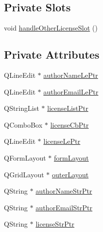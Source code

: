 \subsection*{Private Slots}
\begin{DoxyCompactItemize}
\item 
void \hyperlink{class_new_project_page__3_aa4dede7e921ca1cd0da7c36f421d02b9}{handle\-Other\-License\-Slot} ()
\end{DoxyCompactItemize}
\subsection*{Private Attributes}
\begin{DoxyCompactItemize}
\item 
Q\-Line\-Edit $\ast$ \hyperlink{class_new_project_page__3_aea99558cfb4c4d06ab1d090276c8b500}{author\-Name\-Le\-Ptr}
\item 
Q\-Line\-Edit $\ast$ \hyperlink{class_new_project_page__3_a34b1101f7b0179d76b0cf77e5584233c}{author\-Email\-Le\-Ptr}
\item 
Q\-String\-List $\ast$ \hyperlink{class_new_project_page__3_a5bcc5f30aa601338c5ee258e21868216}{license\-List\-Ptr}
\item 
Q\-Combo\-Box $\ast$ \hyperlink{class_new_project_page__3_a6459aad502f0b64eb7e16b38261bae85}{license\-Cb\-Ptr}
\item 
Q\-Line\-Edit $\ast$ \hyperlink{class_new_project_page__3_aee5b07b36bc086e99302a67d8f3fd7b7}{license\-Le\-Ptr}
\item 
Q\-Form\-Layout $\ast$ \hyperlink{class_new_project_page__3_aae75a18bd217f0736861efe3e3821a6d}{form\-Layout}
\item 
Q\-Grid\-Layout $\ast$ \hyperlink{class_new_project_page__3_ade0fb5d0c05524c44f8b411150533757}{outer\-Layout}
\item 
Q\-String $\ast$ \hyperlink{class_new_project_page__3_a40c6cfc7ba480fd2572459c9ff2d08bb}{author\-Name\-Str\-Ptr}
\item 
Q\-String $\ast$ \hyperlink{class_new_project_page__3_a5c83d9f13f428782e082537dd4c65187}{author\-Email\-Str\-Ptr}
\item 
Q\-String $\ast$ \hyperlink{class_new_project_page__3_aa571b8638ba533ee7e6bee7c476d259e}{license\-Str\-Ptr}
\end{DoxyCompactItemize}


